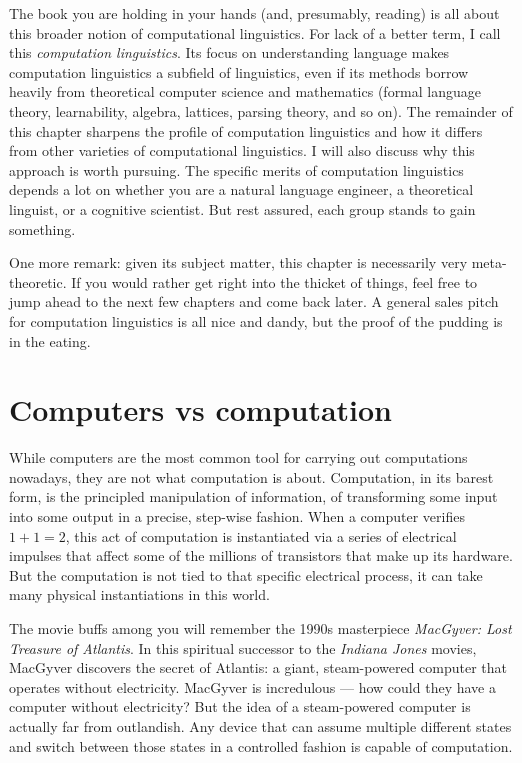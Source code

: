 The book you are holding in your hands (and, presumably, reading) is all about this broader notion of computational linguistics.
For lack of a better term, I call this \emph{computation linguistics}.
Its focus on understanding language makes computation linguistics a subfield of linguistics, even if its methods borrow heavily from theoretical computer science and mathematics (formal language theory, learnability, algebra, lattices, parsing theory, and so on).
The remainder of this chapter sharpens the profile of computation linguistics and how it differs from other varieties of computational linguistics.
I will also discuss why this approach is worth pursuing.
The specific merits of computation linguistics depends a lot on whether you are a natural language engineer, a theoretical linguist, or a cognitive scientist.
But rest assured, each group stands to gain something.

One more remark: given its subject matter, this chapter is necessarily very meta-theoretic.
If you would rather get right into the thicket of things, feel free to jump ahead to the next few chapters and come back later.
A general sales pitch for computation linguistics is all nice and dandy, but the proof of the pudding is in the eating.


\section{Computers vs computation}
\label{sec:formal_computation}

While computers are the most common tool for carrying out computations nowadays, they are not what computation is about.
Computation, in its barest form, is the principled manipulation of information, of transforming some input into some output in a precise, step-wise fashion.
When a computer verifies $1 + 1 = 2$, this act of computation is instantiated via a series of electrical impulses that affect some of the millions of transistors that make up its hardware.
But the computation is not tied to that specific electrical process, it can take many physical instantiations in this world.

The movie buffs among you will remember the 1990s masterpiece \emph{MacGyver: Lost Treasure of Atlantis}.
In this spiritual successor to the \emph{Indiana Jones} movies, MacGyver discovers the secret of Atlantis: a giant, steam-powered computer that operates without electricity.
MacGyver is incredulous --- how could they have a computer without electricity?
But the idea of a steam-powered computer is actually far from outlandish.
Any device that can assume multiple different states and switch between those states in a controlled fashion is capable of computation.

